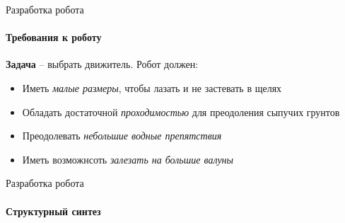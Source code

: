 \documentclass[aspectratio=169,xcolor=table]{beamer}
\begin{document}
\begin{frame}[t]{Разработка робота}
    \framesubtitle{Требования к роботу}
    \large
    \textbf{Задача} --  выбрать движитель. Робот должен:
    \begin{itemize}
        \item Иметь \textit{малые размеры}, чтобы лазать и не застевать в щелях
        \item Обладать достаточной \textit{проходимостью} для преодоления сыпучих грунтов
        \item Преодолевать \textit{небольшие водные препятствия}
        \item Иметь возможнсоть \textit{залезать на большие валуны}
    \end{itemize}
\end{frame}

\begin{frame}[t]{Разработка робота}
    \framesubtitle{Структурный синтез}
\end{frame}
\end{document}
